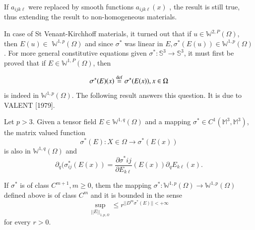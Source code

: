 \begin{remark}\label{chap2-rem2.3.3} %
  If $a_{i j k \ell}$ were replaced by smooth functions $a_{i j k
    \ell}(x)$ , the result is still true, thus extending the result to
  non-homogeneous materials. 
\end{remark}

In case of St Venant-Kirchhoff materials, it turned out that if $u \in
\mathbb {W}^{2, P}(\Omega )$, then $E(u) \in $ $\mathbb
        {W}^{1,p}(\Omega )$ and since $ \sigma ^*$ was linear in $ E,
        \sigma^* (E (u)) \in \mathbb {W}^{1,p}(\Omega )$. For more
        general constitutive equations given $ \sigma^* : \mathbb{S}^3
        \to \mathbb{S}^3$, it must first be proved that if $E \in
        \mathbb {W}^{1, P}(\Omega )$, then 

$$
\sigma ^* (E) (x) \overset{\operatorname{def}}{=} \sigma^* (E(x)) , x \in \Omega
$$
is indeed in $\mathbb {W}^{1,p}(\Omega )$. The following result
answers this question. It is due to VALENT [1979]. 

\begin{theorem}\label{chap2-thm2.3.2} %
  Let $p > 3$. Given a tensor field $E \in \mathbb {W}^{1,q}(\Omega
  )$ and a mapping $\sigma ^* \in C^1 (\mathbb {M}^3, \mathbb {M}^3)$,
  the matrix valued function  
 $$
 \sigma^* (E) : X \in \Omega \to \sigma^* (E (x))	
 $$
 is also in $\mathbb {W}^{1,q}(\Omega )$ and 
 \begin{equation*}
   \partial _q ( \sigma^*_{i j} (E (x)) = \frac{\partial \sigma^* i
     j}{\partial E _{k\ell}} (E(x)) \partial_q E_{k
     \ell}(x). \tag{2.3-13} \label{eq2.3-13}
 \end{equation*} 

If $\sigma ^*$ is of class $ C^{m+1}, m \geq 0$, them the mapping
$\sigma^*: \mathbb{W}^{1,p}(\Omega ) \to \mathbb {W}^{1,p}(\Omega )$
defined above is of class $C^m $ and it is bounded in the sense  
\begin{equation*}
  \sup_{|| E ||_{1, p, \Omega}}\leq r^ {|| D^m \sigma ^* (E) || < +
    \infty} \tag{2.3-14}\label{eq2.3-14} 
\end{equation*}\pageoriginale
for every $r > 0$.
\end{theorem}

